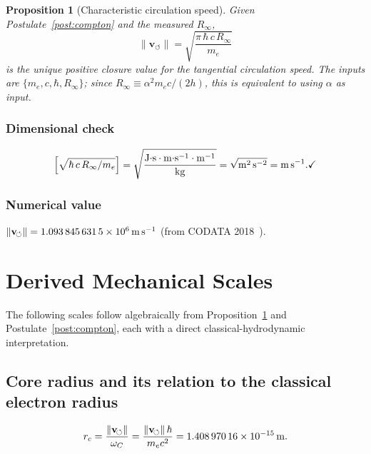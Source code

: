 \documentclass[aps,pra,preprint,longbibliography,nofootinbib]{revtex4-2}
\newtheorem{proposition}{Proposition}
\newcommand{\vnorm}{\lVert\mathbf{v}_{\!\boldsymbol{\circlearrowleft}}\rVert} %
\newcommand{\rc}{r_c}                            %
\newcommand{\omC}{\omega_C}                      %
\newcommand{\Rinf}{R_\infty}                     %
\begin{document}
\begin{proposition}[Characteristic circulation speed]
\label{prop:vc}
Given Postulate~\ref{post:compton} and the measured $\Rinf$,
\begin{equation}
  \boxed{
    \vnorm = \sqrt{\frac{\pi\,\hbar\,c\,\Rinf}{m_e}}
  }
  \label{eq:vc}
\end{equation}
is the unique positive closure value for the tangential
circulation speed.
The inputs are $\{m_e, c, \hbar, \Rinf\}$; since
$\Rinf \equiv \alpha^2 m_e c/(2h)$, this is equivalent to using
$\alpha$ as input.
\end{proposition}

\subsubsection*{Dimensional check}
\[
  \Bigl[\sqrt{\hbar\,c\,\Rinf/m_e}\Bigr]
  = \sqrt{
      \frac{\mathrm{J{\cdot}s\cdot m{\cdot}s^{-1}\cdot m^{-1}}}
           {\mathrm{kg}}
    }
  = \sqrt{\mathrm{m^2\,s^{-2}}} = \mathrm{m\,s^{-1}}. \checkmark
\]

\subsubsection*{Numerical value}
$\vnorm = \SI{1.093\,845\,631\,5e6}{\meter\per\second}$
\quad(from CODATA 2018~\cite{MohrTaylor2018}).

\section{Derived Mechanical Scales}
\label{sec:derived}

The following scales follow algebraically from
Proposition~\ref{prop:vc} and Postulate~\ref{post:compton},
each with a direct classical-hydrodynamic interpretation.

\subsection{Core radius and its relation to the classical electron radius}
\label{sec:rc}

\begin{equation}
  \rc = \frac{\vnorm}{\omC} = \frac{\vnorm\,\hbar}{m_e c^2}
      = \SI{1.408\,970\,16e-15}{\meter}.
  \label{eq:rc}
\end{equation}
\end{document}
